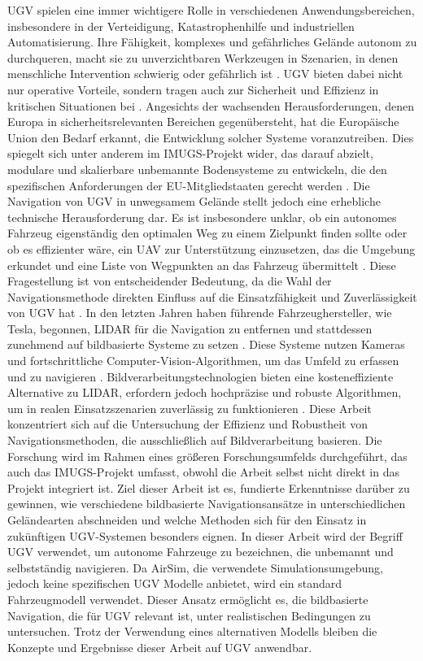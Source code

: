 \ac{UGV} spielen eine immer wichtigere Rolle in verschiedenen Anwendungsbereichen, insbesondere in der Verteidigung, Katastrophenhilfe und industriellen Automatisierung. 
Ihre Fähigkeit, komplexes und gefährliches Gelände autonom zu durchqueren, macht sie zu unverzichtbaren Werkzeugen in Szenarien, in denen menschliche Intervention schwierig oder gefährlich ist \cite{uav:ugv:search:rescue}. 
\ac{UGV} bieten dabei nicht nur operative Vorteile, sondern tragen auch zur Sicherheit und Effizienz in kritischen Situationen bei \cite{ugv:system:indonesia}. 
Angesichts der wachsenden Herausforderungen, denen Europa in sicherheitsrelevanten Bereichen gegenübersteht, hat die Europäische Union den Bedarf erkannt, die Entwicklung solcher Systeme voranzutreiben. 
Dies spiegelt sich unter anderem im \ac{IMUGS}-Projekt wider, das darauf abzielt, modulare und skalierbare unbemannte Bodensysteme zu entwickeln, die den spezifischen Anforderungen der EU-Mitgliedstaaten gerecht werden \cite{mil:ugv:attitudes}.
Die Navigation von \ac{UGV} in unwegsamem Gelände stellt jedoch eine erhebliche technische Herausforderung dar. 
Es ist insbesondere unklar, ob ein autonomes Fahrzeug eigenständig den optimalen Weg zu einem Zielpunkt finden sollte oder ob es effizienter wäre, ein \ac{UAV} zur Unterstützung einzusetzen, das die Umgebung erkundet und eine Liste von Wegpunkten an das Fahrzeug übermittelt \cite{ugv:coverage:energy:efficient}. 
Diese Fragestellung ist von entscheidender Bedeutung, da die Wahl der Navigationsmethode direkten Einfluss auf die Einsatzfähigkeit und Zuverlässigkeit von \ac{UGV} hat \cite{ugv:uav:cooperative:ranging}.
In den letzten Jahren haben führende Fahrzeughersteller, wie Tesla, begonnen, \gls{LIDAR} für die Navigation zu entfernen und stattdessen zunehmend auf bildbasierte Systeme zu setzen \cite{website:tesla:suppport}. 
Diese Systeme nutzen Kameras und fortschrittliche Computer-Vision-Algorithmen, um das Umfeld zu erfassen und zu navigieren \cite{website:tesla:suppport}. 
Bildverarbeitungstechnologien bieten eine kosteneffiziente Alternative zu \gls{LIDAR}, erfordern jedoch hochpräzise und robuste Algorithmen, um in realen Einsatzszenarien zuverlässig zu funktionieren \cite{mil:ugv:attitudes}.
Diese Arbeit konzentriert sich auf die Untersuchung der Effizienz und Robustheit von Navigationsmethoden, die ausschließlich auf Bildverarbeitung basieren. 
Die Forschung wird im Rahmen eines größeren Forschungsumfelds durchgeführt, das auch das \ac{IMUGS}-Projekt umfasst, obwohl die Arbeit selbst nicht direkt in das Projekt integriert ist. 
Ziel dieser Arbeit ist es, fundierte Erkenntnisse darüber zu gewinnen, wie verschiedene bildbasierte Navigationsansätze in unterschiedlichen Geländearten abschneiden und welche Methoden sich für den Einsatz in zukünftigen \ac{UGV}-Systemen besonders eignen.
In dieser Arbeit wird der Begriff \ac{UGV} verwendet, um autonome Fahrzeuge zu bezeichnen, die unbemannt und selbstständig navigieren. 
Da \gls{AirSim}, die verwendete Simulationsumgebung, jedoch keine spezifischen \ac{UGV} Modelle anbietet, wird ein standard Fahrzeugmodell verwendet. 
Dieser Ansatz ermöglicht es, die bildbasierte Navigation, die für \ac{UGV} relevant ist, unter realistischen Bedingungen zu untersuchen. 
Trotz der Verwendung eines alternativen Modells bleiben die Konzepte und Ergebnisse dieser Arbeit auf \ac{UGV} anwendbar.
